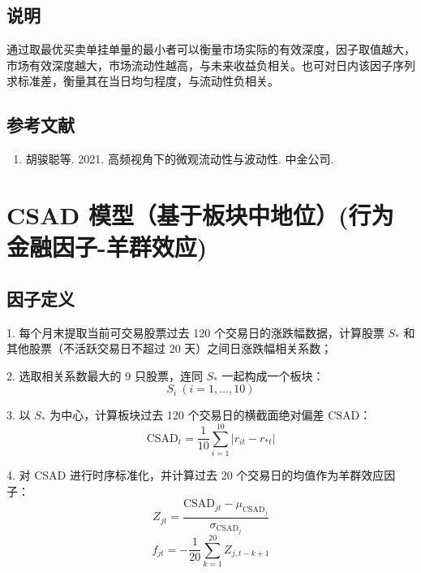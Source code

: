\documentclass{article}
\begin{document}
\subsection{说明}
通过取最优买卖单挂单量的最小者可以衡量市场实际的有效深度，因子取值越大，市场有效深度越大，市场流动性越高，与未来收益负相关。也可对日内该因子序列求标准差，衡量其在当日均匀程度，与流动性负相关。

\subsection{参考文献}
\begin{enumerate}
    \item 胡骏聪等. 2021. 高频视角下的微观流动性与波动性. 中金公司.
\end{enumerate}

\section{CSAD 模型（基于板块中地位）(行为金融因子-羊群效应)}

\subsection{因子定义}

1. 每个月末提取当前可交易股票过去 120 个交易日的涨跌幅数据，计算股票 \( S_* \) 和其他股票（不活跃交易日不超过 20 天）之间日涨跌幅相关系数；

2. 选取相关系数最大的 9 只股票，连同 \( S_* \) 一起构成一个板块：
   \begin{equation}
       S_i \ (i = 1, \dots, 10)
   \end{equation}

3. 以 \( S_* \) 为中心，计算板块过去 120 个交易日的横截面绝对偏差 \( \mathrm{CSAD} \)：
   \begin{equation}
       \mathrm{CSAD}_t = \frac{1}{10} \sum_{i=1}^{10} |r_{it} - r_{*t}|
   \end{equation}

4. 对 CSAD 进行时序标准化，并计算过去 20 个交易日的均值作为羊群效应因子：
   \begin{equation}
       Z_{jt} = \frac{\mathrm{CSAD}_{jt} - \mu_{\mathrm{CSAD}_j}}{\sigma_{\mathrm{CSAD}_j}}
   \end{equation}
   \begin{equation}
       f_{jt} = -\frac{1}{20} \sum_{k=1}^{20} Z_{j,t-k+1}
   \end{equation}
\end{document}
